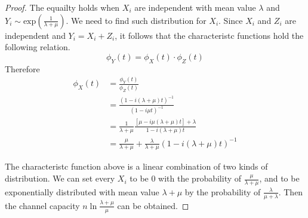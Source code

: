 \begin{exercise}
\begin{proof}
  The equailty holds when $X_i$ are independent with mean value $\lambda$ and $Y_i \sim \text{exp} \left(\frac{1}{\lambda+\mu}\right)$. We need to find such distribution for $X_i$. Since $X_i$ and $Z_i$ are independent and $Y_i = X_i + Z_i$, it follows that the characteristc functions hold the following relation.
  \begin{equation}
    \phi_Y (t) = \phi_X (t) \cdot \phi_Z(t)
  \end{equation}
  Therefore
  \begin{equation}
    \begin{aligned}
      \phi_X (t) &= \frac{\phi_Y(t)}{\phi_Z(t)} \\
      &= \frac{\left(1 - i(\lambda + \mu)t\right)^{-1}}{\left( 1 - i \mu t\right)^{-1}} \\
      &= \frac{1}{\lambda + \mu} \frac{\left[\mu - i \mu (\lambda + \mu)t\right] + \lambda}{1 - i(\lambda + \mu)t} \\
      &= \frac{\mu}{\lambda + \mu} + \frac{\lambda}{\lambda + \mu} \left(1 - i (\lambda + \mu)t\right)^{-1}
    \end{aligned}
  \end{equation}

  The characteristc function above is a linear combination of two kinds of distribution. We can set every $X_i$ to be 0 with the probability of $\frac{\mu}{\lambda + \mu}$, and to be exponentially distributed with mean value $\lambda + \mu$ by the probability of $\frac{\lambda}{\mu + \lambda}$. Then the channel capacity $ n \ln \frac{\lambda + \mu}{\mu} $ can be obtained.

  \end{proof}
  \label{ex9-4}
\end{exercise}